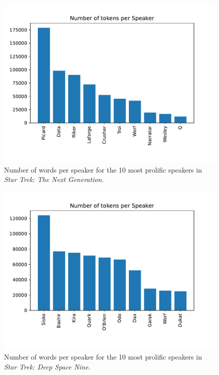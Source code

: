 \begin{figure}
  \centering
  \includegraphics[width=\columnwidth]{figures/localized/tng_group_sizes.pdf}
  \caption{Number of words per speaker for the 10 most prolific speakers in \textit{Star Trek: The Next Generation}.}
  \label{fig:tng_group_sizes}
\end{figure}

\begin{figure}
  \centering
  \includegraphics[width=\columnwidth]{figures/localized/ds9_group_sizes.pdf}
  \caption{Number of words per speaker for the 10 most prolific speakers in \textit{Star Trek: Deep Space Nine}.}
  \label{fig:ds9_group_sizes}
\end{figure}

